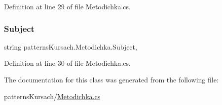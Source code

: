 Definition at line 29 of file Metodichka.\+cs.

\mbox{\label{classpatterns_kursach_1_1_metodichka_a750ddc05459babd1b2a68a7c18358522}} 
\subsubsection{\texorpdfstring{Subject}{Subject}}
{\footnotesize\ttfamily string patterns\+Kursach.\+Metodichka.\+Subject\hspace{0.3cm}{\ttfamily [get]}, {\ttfamily [set]}}



Definition at line 30 of file Metodichka.\+cs.



The documentation for this class was generated from the following file\+:\begin{DoxyCompactItemize}
\item 
patterns\+Kursach/\mbox{\hyperlink{_metodichka_8cs}{Metodichka.\+cs}}\end{DoxyCompactItemize}
